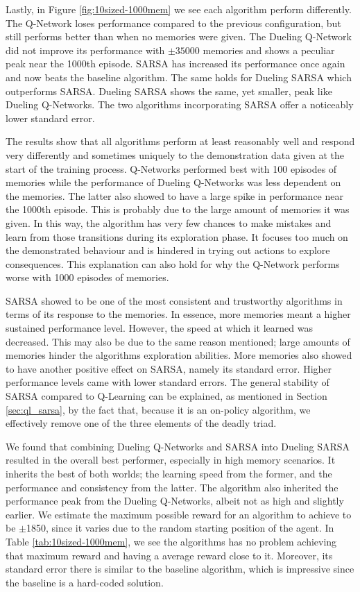 Lastly, in Figure \ref{fig:10sized-1000mem} we see each algorithm perform differently. The Q-Network loses performance compared to the previous configuration, but still performs better than when no memories were given. The Dueling Q-Network did not improve its performance with $\pm 35000$ memories and shows a peculiar peak near the 1000th episode. SARSA has increased its performance once again and now beats the baseline algorithm. The same holds for Dueling SARSA which outperforms SARSA. Dueling SARSA shows the same, yet smaller, peak like Dueling Q-Networks. The two algorithms incorporating SARSA offer a noticeably lower standard error.

The results show that all algorithms perform at least reasonably well and respond very differently and sometimes uniquely to the demonstration data given at the start of the training process. Q-Networks performed best with 100 episodes of memories while the performance of Dueling Q-Networks was less dependent on the memories. The latter also showed to have a large spike in performance near the 1000th episode. This is probably due to the large amount of memories it was given. In this way, the algorithm has very few chances to make mistakes and learn from those transitions during its exploration phase. It focuses too much on the demonstrated behaviour and is hindered in trying out actions to explore consequences. This explanation can also hold for why the Q-Network performs worse with 1000 episodes of memories.

SARSA showed to be one of the most consistent and trustworthy algorithms in terms of its response to the memories. In essence, more memories meant a higher sustained performance level. However, the speed at which it learned was decreased. This may also be due to the same reason mentioned; large amounts of memories hinder the algorithms exploration abilities. More memories also showed to have another positive effect on SARSA, namely its standard error. Higher performance levels came with lower standard errors. The general stability of SARSA compared to Q-Learning can be explained, as mentioned in Section \ref{sec:ql_sarsa}, by the fact that, because it is an on-policy algorithm, we effectively remove one of the three elements of the deadly triad. 

We found that combining Dueling Q-Networks and SARSA into Dueling SARSA resulted in the overall best performer, especially in high memory scenarios. It inherits the best of both worlds; the learning speed from the former, and the performance and consistency from the latter. The algorithm also inherited the performance peak from the Dueling Q-Networks, albeit not as high and slightly earlier. We estimate the maximum possible reward for an algorithm to achieve to be $\pm$1850, since it varies due to the random starting position of the agent. In Table \ref{tab:10sized-1000mem}, we see the algorithms has no problem achieving that maximum reward and having a average reward close to it. Moreover, its standard error there is similar to the baseline algorithm, which is impressive since the baseline is a hard-coded solution.

